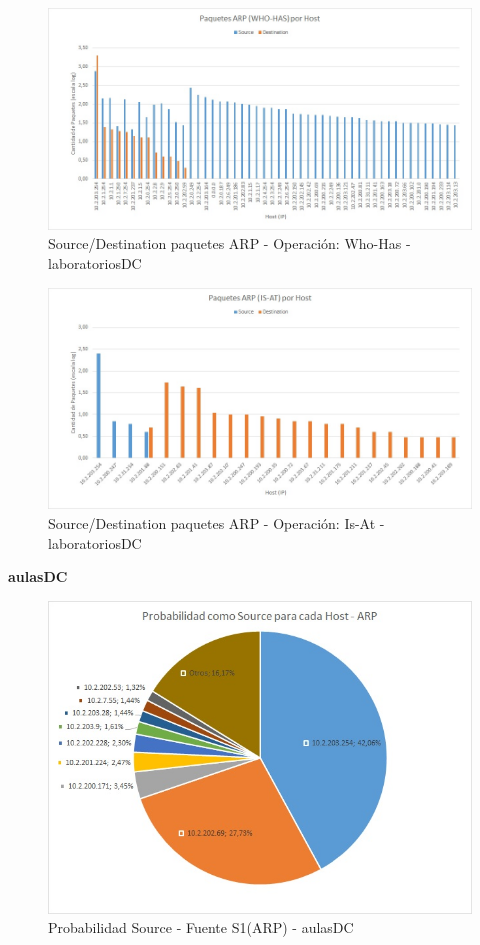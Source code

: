 \begin{figure}[h!]
\centering
\includegraphics[scale=0.7]{./img/arp_whoHas_laboDC.jpg}
\caption{Source/Destination paquetes ARP - Operación: Who-Has - laboratoriosDC}
\end{figure}

\begin{figure}[h!]
\centering
\includegraphics[scale=0.7]{./img/arp_isAt_laboDC.jpg}
\caption{Source/Destination paquetes ARP - Operación: Is-At - laboratoriosDC}
\end{figure}
\newpage

\textbf{aulasDC}
\begin{figure}[h!]
\centering
\includegraphics[scale=0.6]{./img/proba_src_aulasDC.jpg}
\caption{Probabilidad Source - Fuente S1(ARP) - aulasDC}
\end{figure}

